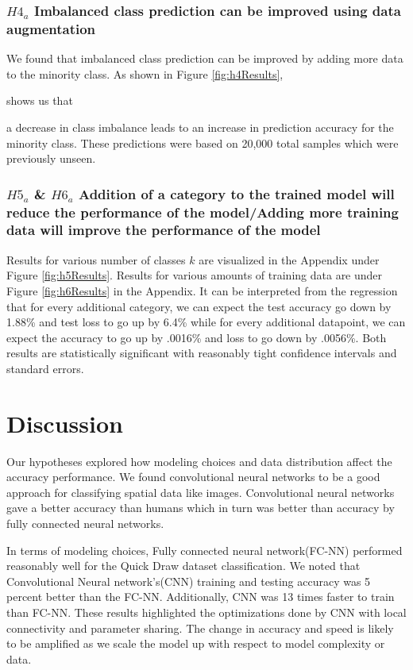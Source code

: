 \documentclass[11pt]{article}
\begin{document}
\subsubsection{$H4_a$\: Imbalanced class prediction can be improved using
  data augmentation}

We found that imbalanced class prediction can be improved by adding more
data to the minority class. As shown in Figure \ref{fig:h4Results}, 

shows us that

a
decrease in class imbalance leads to an increase in prediction accuracy
for the minority class. These predictions were based on 20,000 total
samples which were previously unseen.

\subsubsection{$H5_a$ \& $H6_a$\: Addition of a category to the trained model
  will reduce the performance of the model/Adding more training data will
  improve the performance of the model}

Results for various number of classes $k$ are visualized in the Appendix
under Figure \ref{fig:h5Results}. Results for various amounts of training
data are under Figure \ref{fig:h6Results} in the Appendix. It can be
interpreted from the regression that for every additional category,
we can expect the test accuracy go down by 1.88\% and test loss to go up by
6.4\% while for every additional datapoint, we can expect the accuracy to go
up by .0016\% and loss to go down by .0056\%. Both results are statistically
significant with reasonably tight confidence intervals and standard errors.

\section{Discussion}

Our hypotheses explored how modeling choices and data distribution affect
the accuracy performance. We found convolutional neural networks to be a
good approach for classifying spatial data like images. Convolutional neural
networks gave a better accuracy than humans which in turn was better than
accuracy by fully connected neural networks. 

In terms of modeling choices, Fully connected neural network(FC-NN)
performed reasonably well for the Quick Draw dataset classification. We
noted that Convolutional Neural network’s(CNN) training and testing accuracy
was 5 percent better than the FC-NN. Additionally,  CNN was 13 times faster
to train than FC-NN. These results highlighted the optimizations done by
CNN with local connectivity and parameter sharing. The change in accuracy
and speed is likely to be amplified as we scale the model up with respect
to model complexity or data.
\end{document}
